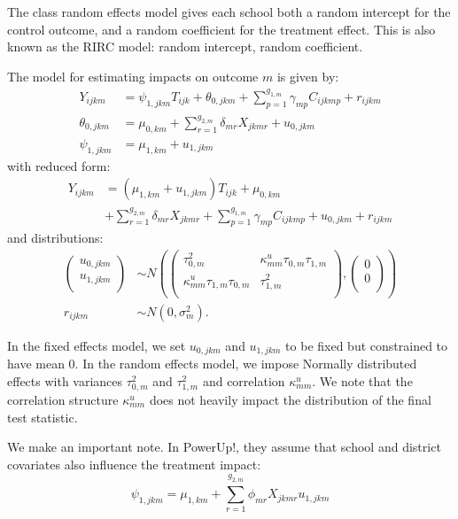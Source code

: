 \documentclass[12pt]{article}
\begin{document}
The class random effects model gives each school both a random intercept for the control outcome, and  a random coefficient for the treatment effect.
This is also known as the RIRC model: random intercept, random coefficient.

The model for estimating impacts on outcome $m$ is given by:
\begin{align}
Y_{ijkm} &= \psi_{1,jkm} T_{ijk} + \theta_{0,jkm} + \sum_{p=1}^{g_{1,m}} \gamma_{mp} C_{ijkmp} + r_{ijkm}\\
\nonumber \theta_{0,jkm} &= \mu_{0,km} + \sum_{r=1}^{g_{2,m}} \delta_{mr} X_{jkmr} + u_{0,jkm}\\
\nonumber \psi_{1,jkm} &= \mu_{1,km} + u_{1,jkm}
\end{align}
with reduced form:
\begin{align}
Y_{ijkm} &= \left(\mu_{1,km} + u_{1,jkm}\right) T_{ijk} + \mu_{0,km} \\
\nonumber & + \sum_{r=1}^{g_{2,m}} \delta_{mr} X_{jkmr} + \sum_{p=1}^{g_{1,m}} \gamma_{mp} C_{ijkmp} + u_{0,jkm} + r_{ijkm}
\end{align}
and distributions:
\begin{align}
\begin{pmatrix} u_{0, jkm} \\ u_{1,jkm}\\ \end{pmatrix} &\sim
N\left(\begin{pmatrix} \tau^2_{0,m} & \kappa^u_{mm} \tau_{0,m} \tau_{1,m} \\ \kappa^u_{mm} \tau_{1,m} \tau_{0,m} & \tau^2_{1,m} \\ \end{pmatrix}, \begin{pmatrix} 0 \\ 0\\ \end{pmatrix}\right) \\
\nonumber r_{ijkm} &\sim N\left(0, \sigma^2_m\right).
\end{align}

In the fixed effects model, we set $u_{0,jkm}$ and $u_{1,jkm}$ to be fixed but constrained to have mean 0.
In the random effects model, we impose Normally distributed effects with variances $\tau_{0,m}^2$ and $\tau_{1,m}^2$ and correlation $\kappa_{mm}^u$. We note that the correlation structure $\kappa_{mm}^u$ does not heavily impact the distribution of the final test statistic.

We make an important note. In PowerUp!, they assume that school and district covariates also influence the treatment impact:
$$ \psi_{1,jkm} = \mu_{1,km} + \sum_{r=1}^{g_{2,m}} \phi_{mr} X_{jkmr} u_{1,jkm}$$
\end{document}
